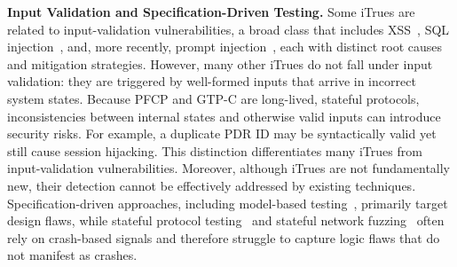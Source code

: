\vspace{2pt}\noindent\textbf{Input Validation and Specification-Driven Testing.}
Some iTrues are related to input-validation vulnerabilities, a broad class that includes XSS~\cite{wassermann2008static}, SQL injection~\cite{al2023sqirl}, and, more recently, prompt injection~\cite{greshake2023not}, each with distinct root causes and mitigation strategies.
However, many other iTrues do not fall under input validation: they are triggered by well-formed inputs that arrive in incorrect system states. Because PFCP and GTP-C are long-lived, stateful protocols, inconsistencies between internal states and otherwise valid inputs can introduce security risks.
For example, a duplicate PDR ID may be syntactically valid yet still cause session hijacking. This distinction differentiates many iTrues from input-validation vulnerabilities.
Moreover, although iTrues are not fundamentally new, their detection cannot be effectively addressed by existing techniques. Specification-driven approaches, including model-based testing~\cite{utting2012taxonomy}, primarily target design flaws, while stateful protocol testing~\cite{ba2022stateful} and stateful network fuzzing~\cite{pham2020aflnet} often rely on crash-based signals and therefore struggle to capture logic flaws that do not manifest as crashes.













